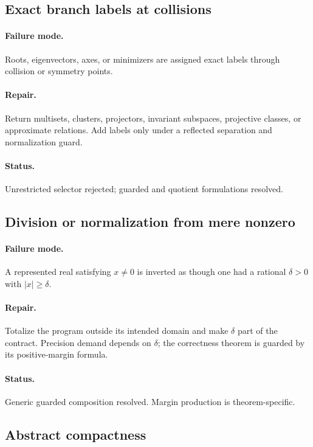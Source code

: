 \subsection{Exact branch labels at collisions}

\paragraph{Failure mode.}
Roots, eigenvectors, axes, or minimizers are assigned exact labels through collision or symmetry points.

\paragraph{Repair.}
Return multisets, clusters, projectors, invariant subspaces, projective classes, or approximate relations.  Add labels only under a reflected separation and normalization guard.

\paragraph{Status.}
Unrestricted selector rejected; guarded and quotient formulations resolved.

\subsection{Division or normalization from mere nonzero}

\paragraph{Failure mode.}
A represented real satisfying \(x\ne0\) is inverted as though one had a rational \(\delta>0\) with \(|x|\ge\delta\).

\paragraph{Repair.}
Totalize the program outside its intended domain and make \(\delta\) part of the contract.  Precision demand depends on \(\delta\); the correctness theorem is guarded by its positive-margin formula.

\paragraph{Status.}
Generic guarded composition resolved.  Margin production is theorem-specific.

\subsection{Abstract compactness}

